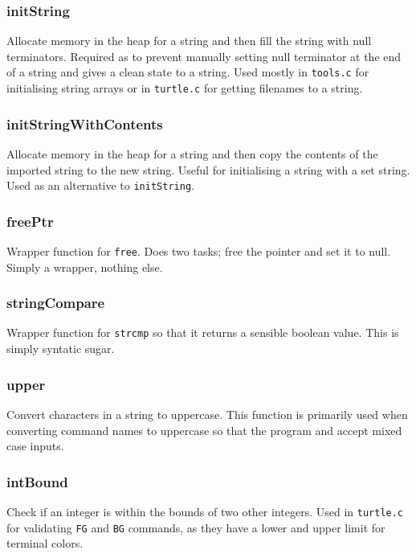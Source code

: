 \documentclass[a4paper, 12pt, titlepage]{article}
\newcommand{\code}[1]{\small\texttt{#1}\normalsize}
\begin{document}
\subsubsection{initString}

Allocate memory in the heap for a string and then fill the string with null 
terminators. Required as to prevent manually setting null terminator at the 
end of a string and gives a clean state to a string. Used mostly in 
\code{tools.c} for initialising string arrays or in \code{turtle.c} for 
getting filenames to a string.

\subsubsection{initStringWithContents}

Allocate memory in the heap for a string and then copy the contents of the 
imported string to the new string. Useful for initialising a string with a
set string. Used as an alternative to \code{initString}.

\subsubsection{freePtr}

Wrapper function for \code{free}. Does two tasks; free the pointer and 
set it to null. Simply a wrapper, nothing else.

\subsubsection{stringCompare}

Wrapper function for \code{strcmp} so that it returns a sensible boolean 
value. This is simply syntatic sugar.

\subsubsection{upper}

Convert characters in a string to uppercase. This function is primarily
used when converting command names to uppercase so that the program and 
accept mixed case inputs.

\subsubsection{intBound}

Check if an integer is within the bounds of two other integers. Used in 
\code{turtle.c} for validating \code{FG} and \code{BG} commands, as they 
have a lower and upper limit for terminal colors.
\end{document}

